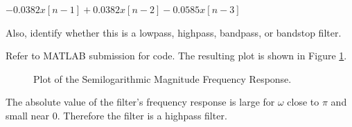 \documentclass[fleqn]{article}
\begin{document}
\begin{enumerate}[nolistsep]
		$- 0.0382x[n-1] + 0.0382x[n-2] - 0.0585x[n-3]$
		
		Also, identify whether this is a lowpass, highpass, bandpass, or bandstop filter.
		
		Refer to MATLAB submission for code. The resulting plot is shown in Figure \ref{prob5_mag_freq_response}.
		
		\begin{figure}[H]				
			\centerline{}
			\caption{Plot of the Semilogarithmic Magnitude Frequency Response.}
			\label{prob5_mag_freq_response}
		\end{figure}
		
		The absolute value of the filter's frequency response is large for $\omega$ close to $\pi$ and small near $0$. Therefore the filter is a highpass filter.
		
	\end{enumerate}
	
\end{document}

